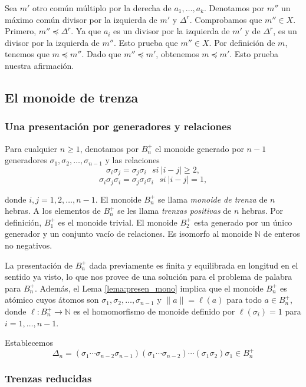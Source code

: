 \documentclass[12pt]{article}
\theoremstyle{definition}
\providecommand{\norm}[1]{\lVert#1\rVert}
\begin{document}
Sea $m'$ otro común múltiplo por la derecha de $a_1,\ldots,a_k$. Denotamos por $m''$ un máximo común divisor por la izquierda de $m'$ y $\Delta^r$. Comprobamos que $m''\in X$. Primero, $m''\preceq\Delta^r$. Ya que $a_i$ es un divisor por la izquierda de $m'$ y de $\Delta^r$, es un divisor por la izquierda de $m''$. Esto prueba que $m''\in X$. Por definición de $m$, tenemos que $m\preceq m''$. Dado que $m''\preceq m'$, obtenemos $m\preceq m'$. Esto prueba nuestra afirmación.

\subsection{El monoide de trenza}

\subsubsection{Una presentación por generadores y relaciones}

Para cualquier $n\geq 1$, denotamos por $B_n^+$ el monoide generado por $n-1$ generadores $\sigma_1,\sigma_2,\ldots,\sigma_{n-1}$ y las relaciones
$$\sigma_i\sigma_j=\sigma_j\sigma_i\ \ \ si\ |i-j|\geq 2,$$
$$\sigma_i\sigma_j\sigma_i=\sigma_j\sigma_i\sigma_i\ \ \ si\ |i-j|= 1,$$

donde $i,j=1,2,\ldots,n-1$. El monoide $B_n^+$ se llama \textit{monoide de trenza} de $n$ hebras. A los elementos de $B_n^+$ se les llama \textit{trenzas positivas} de $n$ hebras. Por definición, $B_1^+$ es el monoide trivial. El monoide $B_2^+$ esta generado por un único generador y un conjunto vacío de relaciones. Es isomorfo al monoide $\mathbb{N}$ de enteros no negativos.

La presentación de $B_n^+$ dada previamente es finita y equilibrada en longitud en el sentido ya visto, lo que nos provee de una solución para el problema de palabra para $B_n^+$. Además, el Lema \ref{lema:presen_mono} implica que el monoide $B_n^+$ es atómico cuyos átomos son $\sigma_1,\sigma_2,\ldots,\sigma_{n-1}$ y $\norm{a}=\ell(a)$ para todo $a\in B_n^+$, donde $\ell : B_n^+\rightarrow \mathbb{N}$ es el homomorfismo de monoide definido por $\ell(\sigma_i)=1$ para $i=1,\ldots,n-1$.

Establecemos
$$\Delta_n = (\sigma_1\cdots\sigma_{n-2}\sigma_{n-1})(\sigma_1\cdots\sigma_{n-2})\cdots(\sigma_1\sigma_2)\sigma_1\in B_n^+$$

\subsubsection{Trenzas reducidas}
\end{document}
